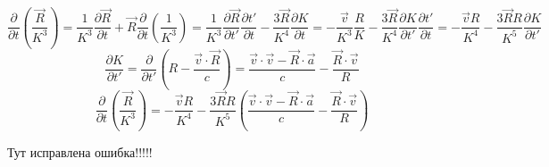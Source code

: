 \documentclass[11pt]{article}
\begin{document}
\[\frac{\partial }{\partial t}\left( \frac{\overrightarrow{R}}{{{K}^{3}}} \right)=\frac{1}{{{K}^{3}}}\frac{\partial \overrightarrow{R}}{\partial t}+\overrightarrow{R}\frac{\partial }{\partial t}\left( \frac{1}{{{K}^{3}}} \right)=\frac{1}{{{K}^{3}}}\frac{\partial \overrightarrow{R}}{\partial t'}\frac{\partial t'}{\partial t}-\frac{3\overrightarrow{R}}{{{K}^{4}}}\frac{\partial K}{\partial t}=-\frac{\overrightarrow{v}}{{{K}^{3}}}\frac{R}{K}-\frac{3\overrightarrow{R}}{{{K}^{4}}}\frac{\partial K}{\partial t'}\frac{\partial t'}{\partial t}=-\frac{\overrightarrow{v}R}{{{K}^{4}}}-\frac{3\overrightarrow{R}R}{{{K}^{5}}}\frac{\partial K}{\partial t'}\]
\[\frac{\partial K}{\partial t'}=\frac{\partial }{\partial t'}\left( R-\frac{\overrightarrow{v}\cdot \overrightarrow{R}}{c} \right)=\frac{\overrightarrow{v}\cdot \overrightarrow{v}-\overrightarrow{R}\cdot \overrightarrow{a}}{c}-\frac{\overrightarrow{R}\cdot \overrightarrow{v}}{R}\]
\[\frac{\partial }{\partial t}\left( \frac{\overrightarrow{R}}{{{K}^{3}}} \right)=-\frac{\overrightarrow{v}R}{{{K}^{4}}}-\frac{3\overrightarrow{R}R}{{{K}^{5}}}\left( \frac{\overrightarrow{v}\cdot \overrightarrow{v}-\overrightarrow{R}\cdot \overrightarrow{a}}{c}-\frac{\overrightarrow{R}\cdot \overrightarrow{v}}{R} \right)\]

Тут исправлена ошибка!!!!!
\end{document}

